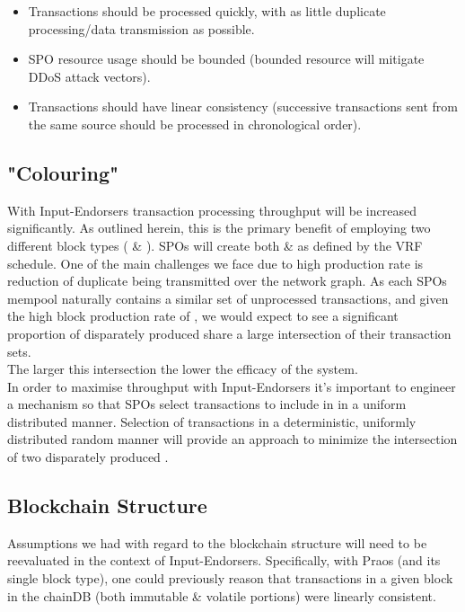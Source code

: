 \documentclass[11pt,a4paper]{article}
\begin{document}
\begin{itemize}
  \item Transactions should be processed quickly, with as little duplicate processing/data transmission as possible.
  \item SPO resource usage should be bounded (bounded resource will mitigate DDoS attack vectors).
  \item Transactions should have linear consistency (successive transactions sent from the same source should be 
        processed in chronological order).
\end{itemize}


\subsection{"Colouring"}
With Input-Endorsers transaction processing throughput will be increased significantly. As outlined herein, this is the
primary benefit of employing two different block types ( \& ).
SPOs will create both  \&  as defined by the VRF schedule. One of the main challenges we 
face due to  high production rate is reduction of duplicate being transmitted over the network graph.
As each SPOs mempool naturally contains a similar set of unprocessed transactions, and given the high block production 
rate of , we would expect to see a significant proportion of disparately produced  share 
a large intersection of their transaction sets. \\ The larger this intersection the lower the efficacy of the system.\\

In order to maximise throughput with Input-Endorsers it's important to engineer a mechanism so that SPOs select
transactions to include in  in a uniform distributed manner. Selection of transactions in a deterministic,
uniformly distributed random manner will provide an approach to minimize the intersection of two disparately produced 
.


\subsection{Blockchain Structure}
Assumptions we had with regard to the blockchain structure will need to be reevaluated in the context of 
Input-Endorsers. Specifically, with Praos (and its single block type), one could previously reason that transactions 
in a given block in the chainDB (both immutable \& volatile portions) were linearly consistent. \\ 
\end{document}
